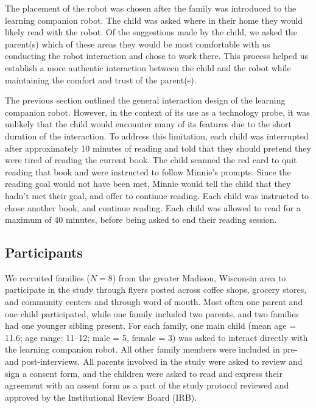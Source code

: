 \documentclass{sigchi}
\begin{document}
The placement of the robot was chosen after the family was introduced to the learning companion robot. The child was asked where in their home they would likely read with the robot. Of the suggestions made by the child, we asked the parent(s) which of these areas they would be most comfortable with us conducting the robot interaction and chose to work there. This process helped us establish a more authentic interaction between the child and the robot while maintaining the comfort and trust of the parent(s).

The previous section outlined the general interaction design of the learning companion robot. However, in the context of its use as a technology probe, it was unlikely that the child would encounter many of its features due to the short duration of the interaction. To address this limitation, each child was interrupted after approximately 10 minutes of reading and told that they should pretend they were tired of reading the current book. The child scanned the red card to quit reading that book and were instructed to follow Minnie's prompts. Since the reading goal would not have been met, Minnie would tell the child that they hadn't met their goal, and offer to continue reading. Each child was instructed to chose another book, and continue reading. Each child was allowed to read for a maximum of 40 minutes, before being asked to end their reading session.


\subsection{Participants}

 We recruited families ($N=8$) from the greater Madison, Wisconsin area to participate in the study through flyers posted across coffee shops, grocery stores, and community centers and through word of mouth. Most often one parent and one child participated, while one family included two parents, and two families had one younger sibling present. For each family, one main child (mean age = 11.6; age range: 11--12; male = 5, female = 3) was asked to interact directly with the learning companion robot. All other family members were included in pre- and post-interviews. All parents involved in the study were asked to review and sign a consent form, and the children were asked to read and express their agreement with an assent form as a part of the study protocol reviewed and approved by the Institutional Review Board (IRB).
\end{document}
